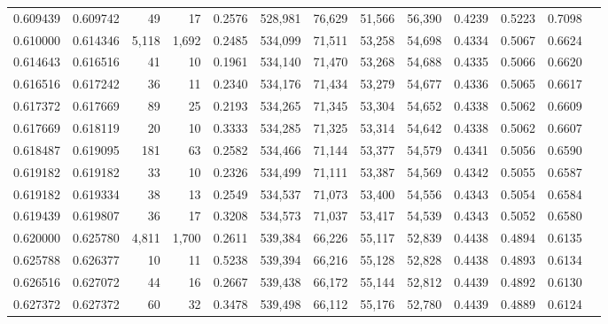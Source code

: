\begin{tabular}{rrrrrrrrrrrrr}
0.609439 & 0.609742 &     49 &    17 &                                     0.2576 & 528,981 &  76,629 &  51,566 &  56,390 & 0.4239 & 0.5223 & 0.7098 \\
0.610000 & 0.614346 &  5,118 & 1,692 &                                     0.2485 & 534,099 &  71,511 &  53,258 &  54,698 & 0.4334 & 0.5067 & 0.6624 \\
0.614643 & 0.616516 &     41 &    10 &                                     0.1961 & 534,140 &  71,470 &  53,268 &  54,688 & 0.4335 & 0.5066 & 0.6620 \\
0.616516 & 0.617242 &     36 &    11 &                                     0.2340 & 534,176 &  71,434 &  53,279 &  54,677 & 0.4336 & 0.5065 & 0.6617 \\
0.617372 & 0.617669 &     89 &    25 &                                     0.2193 & 534,265 &  71,345 &  53,304 &  54,652 & 0.4338 & 0.5062 & 0.6609 \\
0.617669 & 0.618119 &     20 &    10 &                                     0.3333 & 534,285 &  71,325 &  53,314 &  54,642 & 0.4338 & 0.5062 & 0.6607 \\
0.618487 & 0.619095 &    181 &    63 &                                     0.2582 & 534,466 &  71,144 &  53,377 &  54,579 & 0.4341 & 0.5056 & 0.6590 \\
0.619182 & 0.619182 &     33 &    10 &                                     0.2326 & 534,499 &  71,111 &  53,387 &  54,569 & 0.4342 & 0.5055 & 0.6587 \\
0.619182 & 0.619334 &     38 &    13 &                                     0.2549 & 534,537 &  71,073 &  53,400 &  54,556 & 0.4343 & 0.5054 & 0.6584 \\
0.619439 & 0.619807 &     36 &    17 &                                     0.3208 & 534,573 &  71,037 &  53,417 &  54,539 & 0.4343 & 0.5052 & 0.6580 \\
0.620000 & 0.625780 &  4,811 & 1,700 &                                     0.2611 & 539,384 &  66,226 &  55,117 &  52,839 & 0.4438 & 0.4894 & 0.6135 \\
0.625788 & 0.626377 &     10 &    11 &                                     0.5238 & 539,394 &  66,216 &  55,128 &  52,828 & 0.4438 & 0.4893 & 0.6134 \\
0.626516 & 0.627072 &     44 &    16 &                                     0.2667 & 539,438 &  66,172 &  55,144 &  52,812 & 0.4439 & 0.4892 & 0.6130 \\
0.627372 & 0.627372 &     60 &    32 &                                     0.3478 & 539,498 &  66,112 &  55,176 &  52,780 & 0.4439 & 0.4889 & 0.6124 \\

\end{tabular}

